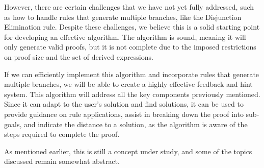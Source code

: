 However, there are certain challenges that we have not yet fully addressed, such as how to handle rules that generate multiple branches, like the Disjunction Elimination rule. Despite these challenges, we believe this is a solid starting point for developing an effective algorithm. The algorithm is sound, meaning it will only generate valid proofs, but it is not complete due to the imposed restrictions on proof size and the set of derived expressions.

If we can efficiently implement this algorithm and incorporate rules that generate multiple branches, we will be able to create a highly effective feedback and hint system. This algorithm will address all the key components previously mentioned. Since it can adapt to the user's solution and find solutions, it can be used to provide guidance on rule applications, assist in breaking down the proof into sub-goals, and indicate the distance to a solution, as the algorithm is aware of the steps required to complete the proof.

As mentioned earlier, this is still a concept under study, and some of the topics discussed remain somewhat abstract.